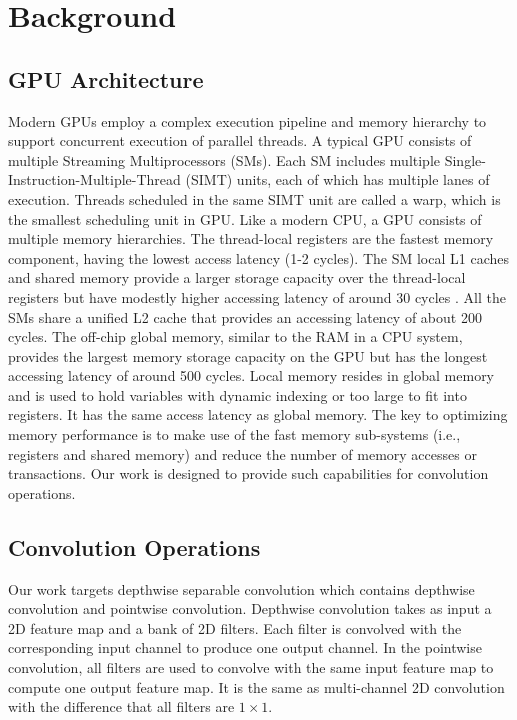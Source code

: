 
\section{Background}
\subsection{GPU Architecture}
Modern GPUs employ a complex execution pipeline and memory hierarchy to support concurrent execution of parallel threads. 
A typical GPU consists of multiple Streaming Multiprocessors (SMs). 
Each SM includes multiple Single-Instruction-Multiple-Thread (SIMT) units, each of which has multiple lanes of execution. 
Threads scheduled in the same SIMT unit are called a warp, which is the smallest scheduling unit in GPU. 
Like a modern CPU, a GPU consists of multiple memory hierarchies. 
The thread-local registers are the fastest memory component, having the lowest access latency (1-2 cycles). 
The SM local L1 caches and shared memory provide a larger storage capacity over the thread-local registers but have modestly higher accessing latency of around 30 cycles \cite{mei2016dissecting,jia2018dissecting}. 
All the SMs share a unified L2 cache that provides an accessing latency of about 200 cycles. 
The off-chip global memory, similar to the RAM in a CPU system, provides the largest memory storage capacity on the GPU but has the longest accessing latency of around 500 cycles. 
Local memory resides in global memory and is used to hold variables with dynamic indexing or too large to fit into registers. 
It has the same access latency as global memory. 
The key to optimizing memory performance is to make use of the fast memory sub-systems (i.e., registers and shared memory) and reduce the number of memory accesses or transactions. 
Our work is designed to provide such capabilities for convolution operations.

\subsection{Convolution Operations}
Our work targets depthwise separable convolution which contains depthwise convolution and pointwise convolution. 
Depthwise convolution takes as input a 2D feature map and a bank of 2D filters. Each filter is convolved with the corresponding input channel to produce one output channel. 
In the pointwise convolution, all filters are used to convolve with the same input feature map to compute one output feature map. It is the same as multi-channel 2D convolution with the difference that all filters are $1 \times 1$.

